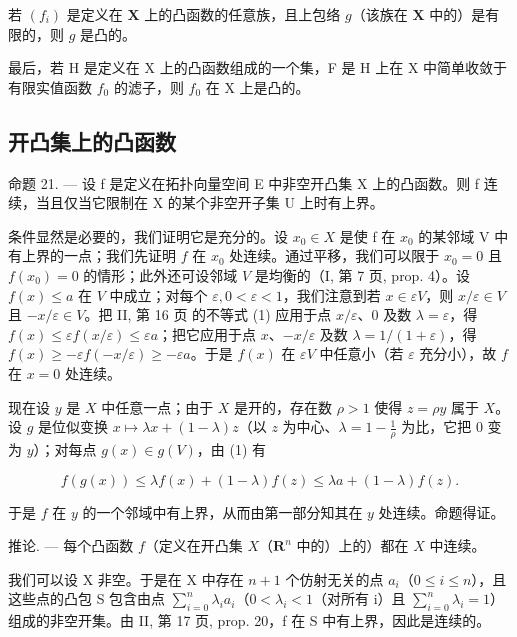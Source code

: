 若 \((f_{i})\) 是定义在 \(\mathbf{X}\) 上的凸函数的任意族，且上包络 \(g\)（该族在 \(\mathbf{X}\) 中的）是有限的，则 \(g\) 是凸的。

最后，若 H 是定义在 X 上的凸函数组成的一个集，F 是 H 上在 X 中简单收敛于有限实值函数 \(f_{0}\) 的滤子，则 \(f_{0}\) 在 X 上是凸的。

\subsection{开凸集上的凸函数}

命题 21. --- 设 f 是定义在拓扑向量空间 E 中非空开凸集 X 上的凸函数。则 f 连续，当且仅当它限制在 X 的某个非空开子集 U 上时有上界。

条件显然是必要的，我们证明它是充分的。设 \(x_{0} \in X\) 是使 f 在 \(x_{0}\) 的某邻域 V 中有上界的一点；我们先证明 \(f\) 在 \(x_0\) 处连续。通过平移，我们可以限于 \(x_0 = 0\) 且 \(f(x_0) = 0\) 的情形；此外还可设邻域 \(V\) 是均衡的（I, 第 7 页, prop. 4）。设 \(f(x) \leqslant a\) 在 \(V\) 中成立；对每个 \(\varepsilon, 0 < \varepsilon < 1\)，我们注意到若 \(x \in \varepsilon V\)，则 \(x / \varepsilon \in V\) 且 \(-x / \varepsilon \in V\)。把 II, 第 16 页 的不等式 (1) 应用于点 \(x / \varepsilon\)、0 及数 \(\lambda = \varepsilon\)，得 \(f(x) \leqslant \varepsilon f(x / \varepsilon) \leqslant \varepsilon a\)；把它应用于点 \(x\)、\(-x / \varepsilon\) 及数 \(\lambda = 1 / (1 + \varepsilon)\)，得 \(f(x) \geqslant -\varepsilon f(-x / \varepsilon) \geqslant -\varepsilon a\)。于是 \(f(x)\) 在 \(\varepsilon V\) 中任意小（若 \(\varepsilon\) 充分小），故 \(f\) 在 \(x = 0\) 处连续。

现在设 \(y\) 是 \(X\) 中任意一点；由于 \(X\) 是开的，存在数 \(\rho > 1\) 使得 \(z = \rho y\) 属于 \(X\)。设 \(g\) 是位似变换 \(x \mapsto \lambda x + (1 - \lambda)z\)（以 \(z\) 为中心、\(\lambda = 1 - \frac{1}{\rho}\) 为比，它把 0 变为 \(y\)）；对每点 \(g(x) \in g(V)\)，由 (1) 有

\[
f (g (x)) \leqslant \lambda f (x) + (1 - \lambda) f (z) \leqslant \lambda a + (1 - \lambda) f (z).
\]

于是 \(f\) 在 \(y\) 的一个邻域中有上界，从而由第一部分知其在 \(y\) 处连续。命题得证。

推论. --- 每个凸函数 \(f\)（定义在开凸集 \(X\)（\(\mathbf{R}^n\) 中的）上的）都在 \(X\) 中连续。

我们可以设 X 非空。于是在 X 中存在 \(n + 1\) 个仿射无关的点 \(a_{i}\)（\(0 \leqslant i \leqslant n\)），且这些点的凸包 S 包含由点 \(\sum_{i=0}^{n} \lambda_{i} a_{i}\)（\(0 < \lambda_{i} < 1\)（对所有 i）且 \(\sum_{i=0}^{n} \lambda_{i} = 1\)）组成的非空开集。由 II, 第 17 页, prop. 20，f 在 S 中有上界，因此是连续的。

